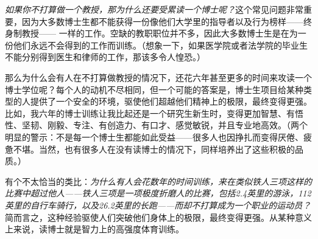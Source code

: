 \documentclass[letter,12pt]{book}
\begin{document}
\begin{CJK}{UTF8}{gbsn}
\emph{如果你不打算做一个教授，那为什么还要受累读一个博士呢？}这个常见问题非常重要，因为大多数博士生都不能获得一份像他们大学里的指导者以及行为榜样——终身制教授—— 一样的工作。空缺的教职职位并不多，因此大多数博士生是在为一份他们永远不会得到的工作而训练。（想象一下，如果医学院或者法学院的毕业生不能分别得到医生和律师的工作，那该多令人惶恐。）

那么为什么会有人在不打算做教授的情况下，还花六年甚至更多的时间来攻读一个博士学位呢？每个人的动机不尽相同，但一个可能的答案是，博士生项目给某种类型的人提供了一个安全的环境，驱使他们超越他们精神上的极限，最终变得更强。比如，我六年的博士训练让我比起还是一个研究生新生时，变得更加智慧、有悟性、坚韧、刚毅、专注、有创造力、有口才、感觉敏锐，并且专业地高效。（两个明显的警示：不是每一个博士生都能如此受益——很多人也因挣扎而变得厌倦、疲惫不堪。当然，也有很多人在没有读博士的情况下，同样培养出了这些积极的品质。）

有个不太恰当的类比：\emph{为什么有人会花数年的时间训练，来在类似铁人三项这样的比赛中超过他人——铁人三项是一项极度折磨人的比赛，包括2.4英里的游泳，112英里的自行车骑行，以及26.2英里的长跑——而却不打算成为一个职业的运动员？}简而言之，这种经验驱使人们突破他们身体上的极限，最终变得更强。从某种意义上来说，读博士就是智力上的高强度体育训练。

\breakline


\end{CJK}
\end{document}
